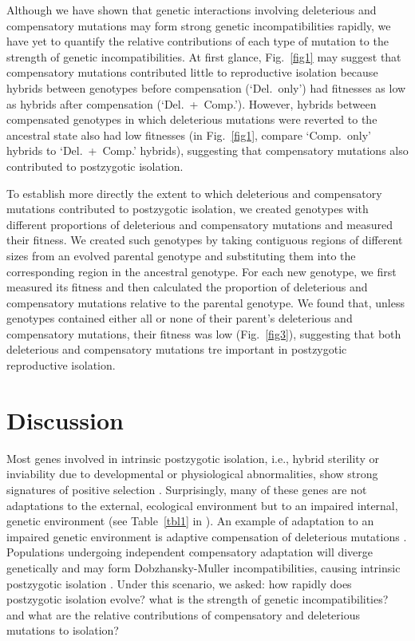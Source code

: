 \documentclass[11pt]{article}
\begin{document}
Although we have shown that genetic interactions
involving deleterious and compensatory mutations
may form strong genetic incompatibilities rapidly,
we have yet to quantify the relative contributions
of each type of mutation to the strength of genetic incompatibilities.
%
At first glance, Fig.~\ref{fig1}
may suggest that compensatory mutations
contributed little to reproductive isolation
because hybrids between genotypes before compensation (`Del.~only')
had fitnesses as low as hybrids after compensation (`Del.~+~Comp.').
%
However, hybrids between compensated genotypes
in which deleterious mutations were reverted to the ancestral state
also had low fitnesses
(in Fig.~\ref{fig1}, compare `Comp.~only' hybrids to `Del.~+~Comp.' hybrids),
suggesting that compensatory mutations
also contributed to postzygotic isolation.



To establish more directly the extent
to which deleterious and compensatory mutations
contributed to postzygotic isolation,
we created genotypes with different proportions
of deleterious and compensatory mutations
and measured their fitness.
%
We created such genotypes by taking contiguous regions of different sizes
from an evolved parental genotype and substituting them
into the corresponding region in the ancestral genotype.
%
For each new genotype, we first measured its fitness and then calculated
the proportion of deleterious and compensatory mutations
relative to the parental genotype.
%
We found that, unless genotypes contained either
all or none of their parent's deleterious and compensatory mutations,
their fitness was low (Fig.~\ref{fig3}),
suggesting that both deleterious and compensatory mutations
tre important in postzygotic reproductive isolation.



\section*{Discussion}

Most genes involved in intrinsic postzygotic isolation,
i.e., hybrid sterility or inviability
due to developmental or physiological abnormalities,
show strong signatures of positive selection \cite{pre10}.
%
Surprisingly, many of these genes
are not adaptations to the external, ecological environment
but to an impaired internal, genetic environment
(see Table~\ref{tbl1} in \cite{pre10}).
%
An example of adaptation to an impaired genetic environment
is adaptive compensation of deleterious mutations
\cite{har96,bur99,moo00,lev00,mai02,est03,est11}.
%
Populations undergoing independent compensatory adaptation
will diverge genetically
and may form Dob\-zhan\-sky-Mul\-ler incompatibilities,
causing intrinsic postzygotic isolation
\cite{orr01,kon02,kul04,coy04,lan07,sch09b,pre10}.
%
Under this scenario, we asked:
how rapidly does postzygotic isolation evolve?
what is the strength of genetic incompatibilities?
and what are the relative contributions
of compensatory and deleterious mutations to isolation?
\end{document}
